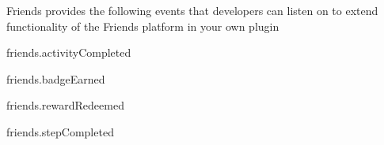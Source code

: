 Friends provides the following events that developers can listen on to extend functionality of the Friends platform in your own plugin


\begin{DoxyItemize}
\item friends.\-activity\-Completed
\item friends.\-badge\-Earned
\item friends.\-reward\-Redeemed
\item friends.\-step\-Completed 
\end{DoxyItemize}
